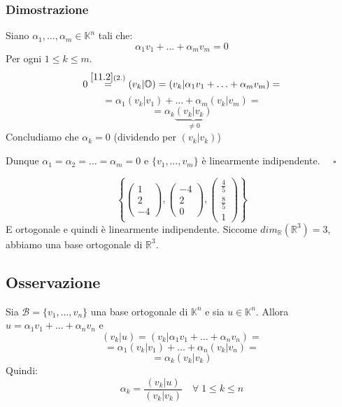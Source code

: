 \documentclass[a4paper]{article}
\theoremstyle{break}
\theoremstyle{break}
\theoremstyle{break}
\theoremstyle{break}
\begin{document}
\subsubsection{Dimostrazione}
Siano \( \alpha_1, \ldots, \alpha_m \in \mathbb{K}^n \) tali che:
\[
\alpha_1v_1 + \ldots + \alpha_mv_m = 0
\] 
Per ogni \( 1 \le k \le m \).
\[
  0 \stackrel{\ref{11.2}(2.)}{=} (v_k|\mathbb{O}) = (v_k|\alpha_1v_1 + \ldots + \alpha_mv_m) =
\] 
\[
 = \alpha_1(v_k|v_1) + \ldots + \alpha_m(v_k|v_m) =
\] 
\[
  = \alpha_k \underbrace{(v_k|v_k)}_{\neq 0}
\] 
Concludiamo che \( \alpha_k = 0 \) (dividendo per \( (v_k|v_k) \))

\noindent Dunque \( \alpha_1 = \alpha_2 = \ldots = \alpha_m = 0 \) e
\( \{v_1, \ldots, v_m\} \) è linearmente indipendente. \( \quad \square \)

\begin{example}
  \[
  \left\{ 
    \begin{pmatrix} 
      1\\2\\-4
    \end{pmatrix} ,
    \begin{pmatrix} 
      -4\\2\\0
    \end{pmatrix} ,
    \begin{pmatrix} 
      \frac{4}{5}\\\frac{8}{5}\\1
    \end{pmatrix} 
  \right\} 
  \] 
  E ortogonale e quindi è linearmente indipendente. Siccome \( dim_{\mathbb{R}}(\mathbb{R}^3) = 3 \),
  abbiamo una base ortogonale di \( \mathbb{R}^3 \).
\end{example}

\subsection{Osservazione}
Sia \( \mathcal{B} = \{v_1, \ldots, v_n\}  \) una base ortogonale di \( \mathbb{K}^n \) e
sia \( u \in \mathbb{K}^n \). Allora \( u = \alpha_1v_1 + \ldots + \alpha_nv_n \) e
\[
  (v_k|u) = (v_k|\alpha_1v_1 + \ldots + \alpha_nv_n) =
\] 
\[
 = \alpha_1(v_k|v_1) + \ldots + \alpha_n(v_k|v_n) =
\] 
\[
 = \alpha_k(v_k|v_k)
\] 
Quindi:
\[
\alpha_k = \frac{(v_k|u)}{(v_k|v_k)} \quad \forall\; 1 \le k \le n
\] 
\end{document}
